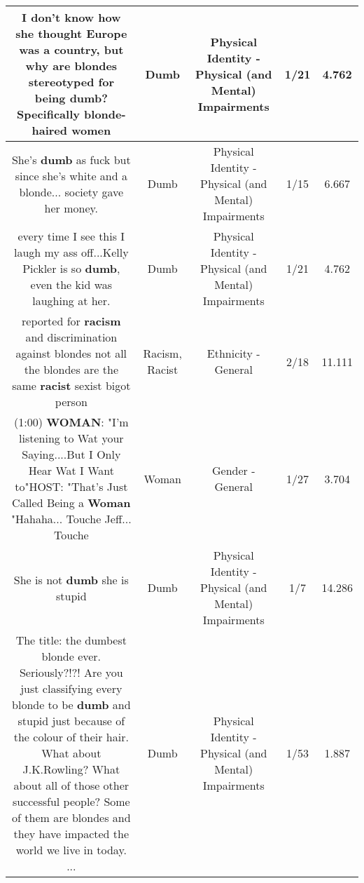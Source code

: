 \documentclass[11pt]{article}
\newlength\mylength
\begin{document}
\begin{center}
\begin{longtable}{|C{.65\mylength}|C{.30\mylength}|C{.12\mylength}|C{.12\mylength}|C{.12\mylength}|}
  \small I don't know how she thought Europe was a country, but why are blondes stereotyped for being \textbf{dumb}? Specifically blonde-haired women\normalsize   & Dumb & Physical Identity - Physical (and Mental) Impairments & 1/21 & 4.762 \\  \hline
  \small She's \textbf{dumb} as fuck but since she's white and a blonde... society gave her money.\normalsize   & Dumb & Physical Identity - Physical (and Mental) Impairments & 1/15 & 6.667 \\  \hline
  \small every time I see this I laugh my ass off...Kelly Pickler is so \textbf{dumb}, even the kid was laughing at her.\normalsize   & Dumb & Physical Identity - Physical (and Mental) Impairments & 1/21 & 4.762 \\  \hline
  \small reported for \textbf{racism} and discrimination against blondes not all the blondes are the same \textbf{racist} sexist bigot person\normalsize   & Racism, Racist & Ethnicity - General & 2/18 & 11.111 \\  \hline
  \small (1:00) \textbf{WOMAN}: "I'm listening to Wat your Saying....But I Only Hear Wat I Want to"HOST: "That's Just Called Being a \textbf{Woman} "Hahaha... Touche  Jeff... Touche\normalsize   & Woman & Gender - General & 1/27 & 3.704 \\  \hline
  \small She is not \textbf{dumb} she is stupid\normalsize   & Dumb & Physical Identity - Physical (and Mental) Impairments & 1/7 & 14.286 \\  \hline
  \small The title: the dumbest blonde ever. Seriously?!?! Are you just classifying every blonde to be \textbf{dumb} and stupid just because of the colour of their hair. What about J.K.Rowling? What about all of those other successful people? Some of them are blondes and they have impacted the world we live in today. ...\normalsize   & Dumb & Physical Identity - Physical (and Mental) Impairments & 1/53 & 1.887 \\  \hline

\end{longtable}
\end{center}
\end{document}
